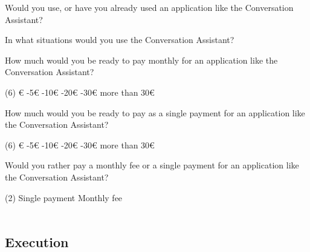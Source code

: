 \documentclass[english, 12pt, a4paper, pdftex, elec, utf8]{aaltothesis}
\begin{document}
{\begin{questionnaire}[resume]
        \item Would you use, or have you already used an application like the Conversation Assistant?
        \item In what situations would you use the Conversation Assistant?
        \item How much would you be ready to pay monthly for an application like the Conversation Assistant?
        \begin{tasks}[label-width = 2em](6)
            €
            -5€
            -10€
            -20€
            -30€
            \task more than 30€
        \end{tasks}
        \item How much would you be ready to pay as a single payment for an application like the Conversation Assistant?
        \begin{tasks}[label-width = 2em](6)
            €
            -5€
            -10€
            -20€
            -30€
            \task more than 30€
        \end{tasks}
        \item Would you rather pay a monthly fee or a single payment for an application like the Conversation Assistant?
        \begin{tasks}[label-width = 2em](2)
            \task Single payment
            \task Monthly fee \\\\
        \end{tasks}
    \end{questionnaire}
}

\clearpage

\subsection{Execution} \label{sec:execution}
\end{document}
